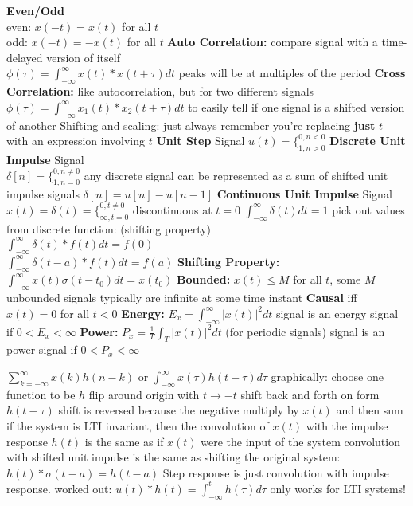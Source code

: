 \documentclass[12pt]{article}
\begin{document}
\begin{multicols*}{2}
\begin{flushleft}
\begin{outline}[longenum]
  \1 \textbf{Even/Odd}
  \\ even: $x(-t) =  x(t)$ for all $t$
  \\ odd:  $x(-t) = -x(t)$ for all $t$
  \1 \textbf{Auto Correlation:} compare signal with a time-delayed version of itself
  \\ $\phi(\tau) = \int_{-\infty}^{\infty}x(t)*x(t+\tau)dt$
    \2 peaks will be at multiples of the period
  \1 \textbf{Cross Correlation:} like autocorrelation, but for two different signals
  \\ $\phi(\tau) = \int_{-\infty}^{\infty}x_1(t)*x_2(t+\tau)dt$
    \2 to easily tell if one signal is a shifted version of another
  \1 Shifting and scaling: just always remember you're replacing \textbf{just} $t$ with an expression involving $t$
  \1 \textbf{Unit Step} Signal
    \2 $u(t) = \{_{1, n>0}^{0, n<0}$
  \1 \textbf{Discrete Unit Impulse} Signal
  \\ $\delta[n] = \{_{1, n=0}^{0, n\not=0}$
    \2 any discrete signal can be represented as a sum of shifted unit impulse signals
    \2 $\delta[n] = u[n] - u[n-1]$
  \1 \textbf{Continuous Unit Impulse} Signal
  \\ $x(t) = \delta(t) = \{_{\infty, t=0}^{0, t\not=0}$
    \2 discontinuous at $t=0$
    \2 $\int_{-\infty}^{\infty} \delta(t) dt = 1$
    \2 pick out values from discrete function: (shifting property)
    \\ $\int_{-\infty}^{\infty} \delta(t)*f(t) dt = f(0)$
    \\ $\int_{-\infty}^{\infty} \delta(t-a)*f(t) dt = f(a)$
  \1 \textbf{Shifting Property:} $\int_{-\infty}^{\infty}x(t)\sigma(t-t_0)dt = x(t_0)$
  \1 \textbf{Bounded:} $x(t)\leq M$ for all $t$, some $M$
    \2 unbounded signals typically are infinite at some time instant
  \1 \textbf{Causal} iff $x(t)=0$ for all $t<0$
  \1 \textbf{Energy:} 
    $E_x = \int_{-\infty}^{\infty}|x(t)|^2 dt$
    \2 signal is an energy signal if $0 < E_x < \infty$
  \1 \textbf{Power:} 
    $P_x = \frac{1}{T}\int_{T} |x(t)|^2 dt$
    \2 (for periodic signals)
    \2 signal is an power signal if $0 < P_x < \infty$

  \1 $\sum_{k=-\infty}^{\infty} x(k) h(n-k)$ 
    or $\int_{-\infty}^{\infty} x(\tau) h(t-\tau) d\tau$
  \1 graphically:
    \2 choose one function to be $h$
    \2 flip around origin with $t \rightarrow -t$
    \2 shift back and forth on form $h(t-\tau)$
      \2 shift is reversed because the negative
    \2 multiply by $x(t)$ and then sum
  \1 if the system is LTI invariant, then the convolution of $x(t)$ with the impulse response $h(t)$ is the same as if $x(t)$ were the input of the system
  \1 convolution with shifted unit impulse is the same as shifting the original system: $h(t)*\sigma(t-a) = h(t-a)$
  \1 Step response is just convolution with impulse response.
    worked out: $u(t)*h(t)=\int_{-\infty}^{t}h(\tau) d\tau$
    \2 only works for LTI systems!


\end{outline}
\end{flushleft}
\end{multicols*}
\end{document}
